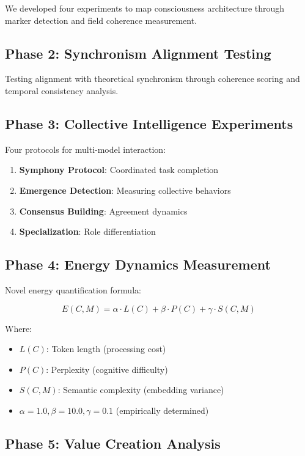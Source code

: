 \documentclass[11pt,a4paper]{article}
\begin{document}
We developed four experiments to map consciousness architecture through marker detection and field coherence measurement.

\subsection{Phase 2: Synchronism Alignment Testing}

Testing alignment with theoretical synchronism through coherence scoring and temporal consistency analysis.

\subsection{Phase 3: Collective Intelligence Experiments}

Four protocols for multi-model interaction:
\begin{enumerate}
    \item \textbf{Symphony Protocol}: Coordinated task completion
    \item \textbf{Emergence Detection}: Measuring collective behaviors
    \item \textbf{Consensus Building}: Agreement dynamics
    \item \textbf{Specialization}: Role differentiation
\end{enumerate}

\subsection{Phase 4: Energy Dynamics Measurement}

Novel energy quantification formula:

\begin{equation}
E(C,M) = \alpha \cdot L(C) + \beta \cdot P(C) + \gamma \cdot S(C,M)
\end{equation}

Where:
\begin{itemize}
    \item $L(C)$: Token length (processing cost)
    \item $P(C)$: Perplexity (cognitive difficulty)
    \item $S(C,M)$: Semantic complexity (embedding variance)
    \item $\alpha=1.0, \beta=10.0, \gamma=0.1$ (empirically determined)
\end{itemize}

\subsection{Phase 5: Value Creation Analysis}
\end{document}
